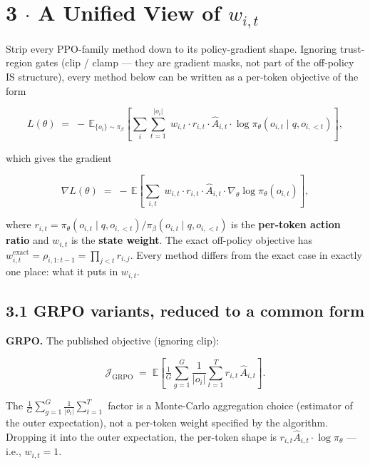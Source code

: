 \documentclass[11pt,a4paper]{article}
\theoremstyle{remark}
\begin{document}
\section*{3 $\cdot$ A Unified View of $w_{i,t}$}

Strip every PPO-family method down to its policy-gradient shape. Ignoring trust-region gates (clip / clamp --- they are gradient masks, not part of the off-policy IS structure), every method below can be written as a per-token objective of the form


\begin{equation*}
L(\theta) \;=\; -\,\mathbb E_{\{o_i\}\sim\pi_\beta}\!\left[\sum_i\sum_{t=1}^{|o_i|}\; w_{i,t}\cdot r_{i,t}\cdot \hat A_{i,t}\cdot \log\pi_\theta(o_{i,t}\mid q, o_{i,<t})\right],
\end{equation*}


which gives the gradient


\begin{equation*}
\nabla L(\theta) \;=\; -\,\mathbb E\!\left[\sum_{i,t}\; w_{i,t}\cdot r_{i,t}\cdot \hat A_{i,t}\cdot \nabla_\theta\log\pi_\theta(o_{i,t})\right],
\end{equation*}


where $r_{i,t}=\pi_\theta(o_{i,t}\mid q,o_{i,<t})/\pi_\beta(o_{i,t}\mid q,o_{i,<t})$ is the \textbf{per-token action ratio} and $w_{i,t}$ is the \textbf{state weight}. The exact off-policy objective has $w_{i,t}^{\text{exact}}=\rho_{i,1:t-1}=\prod_{j<t}r_{i,j}$. Every method differs from the exact case in exactly one place: what it puts in $w_{i,t}$.

\subsection*{3.1 GRPO variants, reduced to a common form}

\textbf{GRPO.} The published objective (ignoring clip):


\begin{equation*}
\mathcal J_{\text{GRPO}} \;=\; \mathbb E\!\left[\tfrac{1}{G}\sum_{g=1}^{G}\frac{1}{|o_i|}\sum_{t=1}^{T} r_{i,t}\,\hat A_{i,t}\right].
\end{equation*}


The $\frac{1}{G}\sum_{g=1}^{G}\frac{1}{|o_i|}\sum_{t=1}^{T}$ factor is a Monte-Carlo aggregation choice (estimator of the outer expectation), not a per-token weight specified by the algorithm. Dropping it into the outer expectation, the per-token shape is $r_{i,t}\hat A_{i,t}\cdot\log\pi_\theta$ --- i.e., $w_{i,t}=1$.
\end{document}
